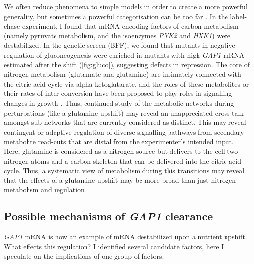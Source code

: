 We often reduce phenomena to simple models in order to
create a more powerful generality, but sometimes a
powerful categorization can be too far
\parencite{lazebnik2002can}.
In the label-chase experiment, I found that mRNA encoding factors of
carbon metabolism (namely pyruvate metabolism, and the isoenzymes 
\textit{PYK2} and \textit{HXK1}) were destabilized.
In the genetic screen (BFF), we found that mutants in negative
regulation of gluconeogenesis were enriched in mutants with high
\textit{GAP1} mRNA estimated after the shift
(\autoref{fig:gluco}), suggesting defects 
in repression. The core of nitrogen metabolism (glutamate and
glutamine) are intimately connected with the citric acid cycle via
alpha-ketoglutarate, and the roles of these metabolites or their
rates of inter-conversion have been proposed to play roles in
signalling changes in growth \parencite{fayyad2016yeast}.
Thus, continued study of the metabolic networks during perturbations
(like a glutamine upshift) may reveal an unappreciated cross-talk
amongst sub-networks that are currently considered as distinct. 
This may reveal contingent or adaptive regulation of diverse
signalling pathways from secondary metabolite read-outs that are
distal from the experimenter's intended input.
Here, glutamine is considered as a nitrogen-source but delivers to 
the cell two nitrogen atoms and a carbon skeleton that can be
delivered into the citric-acid cycle.
Thus, a systematic view of metabolism during this transitions may
reveal that the effects of a glutamine upshift may be more broad than
just nitrogen metabolism and regulation.

\subsection{Possible mechanisms of \textit{GAP1} clearance}

\textit{GAP1} mRNA is now an example of mRNA destabilized upon
a nutrient upshift. What effects this regulation?
I identified several candidate factors, here I speculate on the
implications of one group of factors.

